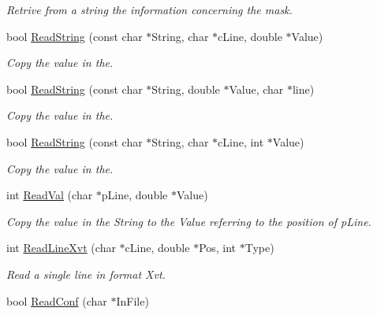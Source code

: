 \begin{DoxyCompactItemize}
\begin{DoxyCompactList}\small\item\em \-Retrive from a string the information concerning the mask. \end{DoxyCompactList}\item 
bool \hyperlink{classVarData_ab48c8e53b923767c73cb13848ecd2fd6}{\-Read\-String} (const char $\ast$\-String, char $\ast$c\-Line, double $\ast$\-Value)
\begin{DoxyCompactList}\small\item\em \-Copy the value in the. \end{DoxyCompactList}\item 
bool \hyperlink{classVarData_a337c48b3218d18409ff180f710421f2d}{\-Read\-String} (const char $\ast$\-String, double $\ast$\-Value, char $\ast$line)
\begin{DoxyCompactList}\small\item\em \-Copy the value in the. \end{DoxyCompactList}\item 
bool \hyperlink{classVarData_adaef8865e533156a71becc0fa083eb9b}{\-Read\-String} (const char $\ast$\-String, char $\ast$c\-Line, int $\ast$\-Value)
\begin{DoxyCompactList}\small\item\em \-Copy the value in the. \end{DoxyCompactList}\item 
\hypertarget{classVarData_a91210b2064dbd96a76aeeadf9a3d3364}{int \hyperlink{classVarData_a91210b2064dbd96a76aeeadf9a3d3364}{\-Read\-Val} (char $\ast$p\-Line, double $\ast$\-Value)}\label{classVarData_a91210b2064dbd96a76aeeadf9a3d3364}

\begin{DoxyCompactList}\small\item\em \-Copy the value in the \-String to the \-Value referring to the position of p\-Line. \end{DoxyCompactList}\item 
\hypertarget{classVarData_aa7f1d8e6b048273ed4b7fc4b653427d0}{int \hyperlink{classVarData_aa7f1d8e6b048273ed4b7fc4b653427d0}{\-Read\-Line\-Xvt} (char $\ast$c\-Line, double $\ast$\-Pos, int $\ast$\-Type)}\label{classVarData_aa7f1d8e6b048273ed4b7fc4b653427d0}

\begin{DoxyCompactList}\small\item\em \-Read a single line in format \-Xvt. \end{DoxyCompactList}\item 
\hypertarget{classVarData_a36c85650c83c9e9e2c97b29ebbf4e782}{bool \hyperlink{classVarData_a36c85650c83c9e9e2c97b29ebbf4e782}{\-Read\-Conf} (char $\ast$\-In\-File)}\label{classVarData_a36c85650c83c9e9e2c97b29ebbf4e782}


\end{DoxyCompactItemize}
